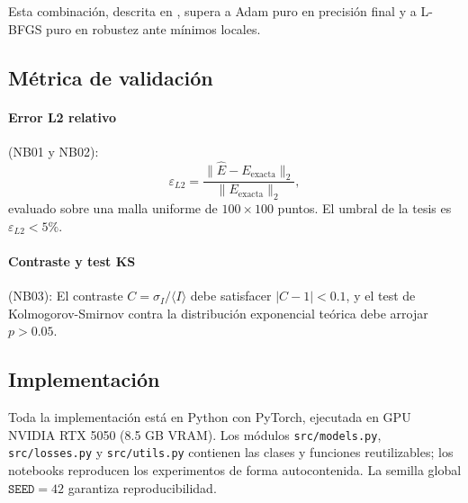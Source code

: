 Esta combinación, descrita en \citet{Wang2021_failurePINNs}, supera a Adam puro en
precisión final y a L-BFGS puro en robustez ante mínimos locales.

\subsection{Métrica de validación}
\label{subsec:metricas}

\paragraph{Error L2 relativo} (NB01 y NB02):
%
\begin{equation}
  \varepsilon_{L2} = \frac{\|\hat{E} - E_{\mathrm{exacta}}\|_2}{\|E_{\mathrm{exacta}}\|_2},
  \label{eq:l2}
\end{equation}
%
evaluado sobre una malla uniforme de $100 \times 100$ puntos.
El umbral de la tesis es $\varepsilon_{L2} < 5\%$.

\paragraph{Contraste y test KS} (NB03):
El contraste $C = \sigma_I / \langle I \rangle$ debe satisfacer $|C - 1| < 0.1$,
y el test de Kolmogorov-Smirnov contra la distribución exponencial teórica debe
arrojar $p > 0.05$.

\subsection{Implementación}
\label{subsec:implementacion}

Toda la implementación está en Python con PyTorch, ejecutada en GPU NVIDIA RTX 5050
(8.5 GB VRAM).
Los módulos \texttt{src/models.py}, \texttt{src/losses.py} y \texttt{src/utils.py}
contienen las clases y funciones reutilizables; los notebooks reproducen los experimentos
de forma autocontenida.
La semilla global $\texttt{SEED} = 42$ garantiza reproducibilidad.

